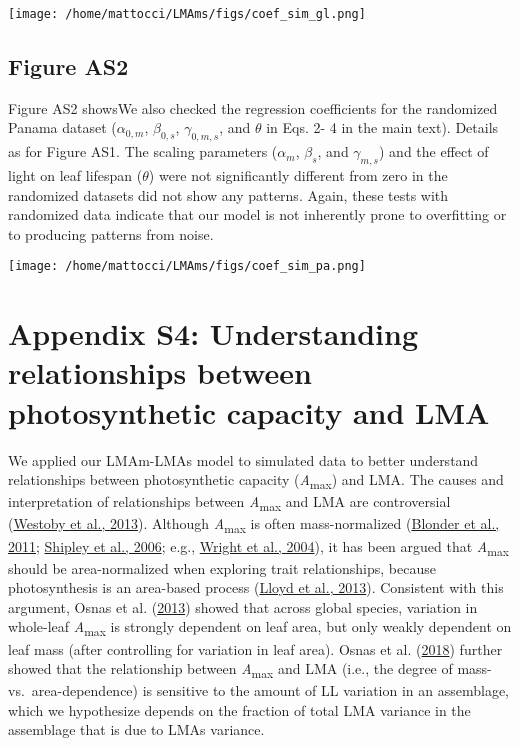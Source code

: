 \documentclass[
  12pt,
  letterpaper,
  DIV=11,
  numbers=noendperiod]{scrartcl}
\begin{document}
\texttt{[image: /home/mattocci/LMAms/figs/coef\_sim\_gl.png]}

\newpage

\hypertarget{figure-as2}{%
\subsection{Figure AS2}\label{figure-as2}}

Figure AS2 showsWe also checked the regression coefficients for the
randomized Panama dataset (\(\alpha_{0, m}\), \(\beta_{0, s}\),
\(\gamma_{0, m, s}\), and \(\theta\) in Eqs. 2- 4 in the main text).
Details as for Figure AS1. The scaling parameters (\(\alpha_{m}\),
\(\beta_{s}\), and \(\gamma_{m, s}\)) and the effect of light on leaf
lifespan (\(\theta\)) were not significantly different from zero in the
randomized datasets did not show any patterns. Again, these tests with
randomized data indicate that our model is not inherently prone to
overfitting or to producing patterns from noise.

\texttt{[image: /home/mattocci/LMAms/figs/coef\_sim\_pa.png]}

\newpage

\hypertarget{appendix-s4-understanding-relationships-between-photosynthetic-capacity-and-lma}{%
\section{Appendix S4: Understanding relationships between photosynthetic
capacity and
LMA}\label{appendix-s4-understanding-relationships-between-photosynthetic-capacity-and-lma}}

We applied our LMAm-LMAs model to simulated data to better understand
relationships between photosynthetic capacity
(\emph{A}\textsubscript{max}) and LMA. The causes and interpretation of
relationships between \emph{A}\textsubscript{max} and LMA are
controversial (\protect\hyperlink{ref-Westoby2013}{Westoby et al.,
2013}). Although \emph{A}\textsubscript{max} is often mass-normalized
(\protect\hyperlink{ref-Blonder2011}{Blonder et al., 2011};
\protect\hyperlink{ref-Shipley2006}{Shipley et al., 2006}; e.g.,
\protect\hyperlink{ref-Wright2004a}{Wright et al., 2004}), it has been
argued that \emph{A}\textsubscript{max} should be area-normalized when
exploring trait relationships, because photosynthesis is an area-based
process (\protect\hyperlink{ref-Lloyd2013}{Lloyd et al., 2013}).
Consistent with this argument, Osnas et al.
(\protect\hyperlink{ref-Osnas2013}{2013}) showed that across global
species, variation in whole-leaf \emph{A}\textsubscript{max} is strongly
dependent on leaf area, but only weakly dependent on leaf mass (after
controlling for variation in leaf area). Osnas et al.
(\protect\hyperlink{ref-Osnas2018}{2018}) further showed that the
relationship between \emph{A}\textsubscript{max} and LMA (i.e., the
degree of mass- vs.~area-dependence) is sensitive to the amount of LL
variation in an assemblage, which we hypothesize depends on the fraction
of total LMA variance in the assemblage that is due to LMAs variance.
\end{document}
